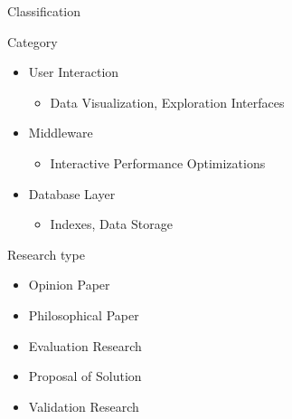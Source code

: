 \documentclass[10pt,notes]{beamer}
\begin{document}
\begin{frame}{Classification}
        \begin{block}{Category~\cite{Idreos2015}}
            \begin{itemize}
                \item User Interaction
                    \begin{itemize}
                        \item Data Visualization, Exploration Interfaces
                    \end{itemize}
                \item Middleware
                    \begin{itemize}
                        \item Interactive Performance Optimizations
                    \end{itemize}
                \item Database Layer
                    \begin{itemize}
                        \item Indexes, Data Storage
                    \end{itemize}
            \end{itemize}
        \end{block}
        \begin{block}{Research type~\cite{Wieringa2006}}
            \begin{itemize}
                \item Opinion Paper
                \item Philosophical Paper
                \item Evaluation Research
                \item Proposal of Solution
                \item Validation Research
            \end{itemize}
        \end{block}
\end{frame}
\end{document}
